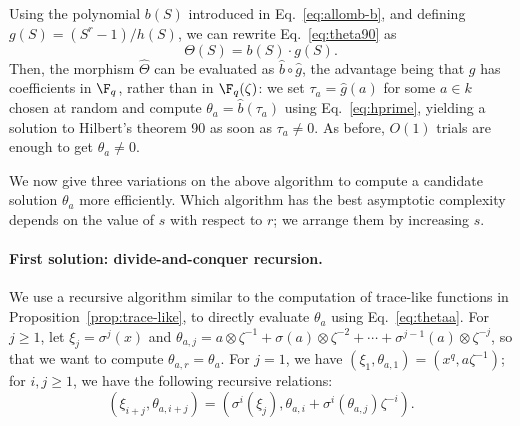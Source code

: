 Using the polynomial $b(S)$ introduced in Eq.~\eqref{eq:allomb-b},
and defining
$g(S)=(S^r-1)/h(S)$, we can rewrite Eq.~\eqref{eq:theta90} as
\begin{equation}
  \label{eq:theta90bis}
  \Theta(S) = b(S) \cdot g(S).
\end{equation}
Then, the morphism $\hat\Theta$ can be evaluated
as $\hat{b}\circ\hat{g}$, the advantage being that $g$ has
coefficients in $\F_q$, rather than in $\F_q(\zeta)$: we set $\tau_a = \hat{g}(a)$ for some $a\in k$ chosen at random
and compute $\theta_a = \hat{b}(\tau_a)$ using Eq.~\eqref{eq:hprime},
yielding a solution to Hilbert's theorem 90 as soon as $\tau_a \neq 0$.
As before, $O(1)$ trials are enough to get $\theta_a \neq 0$.



We now give three variations on the above algorithm to compute 
a candidate solution $\theta_a$ more efficiently.
Which algorithm has the best asymptotic complexity depends on the
value of $s$ with respect to $r$; we arrange them by increasing $s$.



\paragraph{\bf First solution: divide-and-conquer recursion.}
We use a recursive algorithm similar to the computation of trace-like
functions in Proposition~\ref{prop:trace-like}, to directly evaluate
$\theta_a$ using Eq.~\eqref{eq:thetaa}. For $j \ge 1$, let
$\xi_j=\sigma^j(x)$ and $\theta_{a,j} = a\otimes\zeta^{-1} +
\sigma(a)\otimes\zeta^{-2} + \cdots +
\sigma^{j-1}(a)\otimes\zeta^{-j}$, so that we want to compute
$\theta_{a,r}=\theta_a$. For $j=1$, we have $(\xi_1,\theta_{a,1})=
(x^q, a\zeta^{-1})$; for $i,j \ge 1$, we have the following
recursive relations:
\begin{equation}
\label{eq:theta-recursive}
(\xi_{i+j}, \theta_{a, i+j}) = (\sigma^i(\xi_j), \theta_{a,i} + \sigma^i(\theta_{a,j})\zeta^{-i}).
\end{equation}

